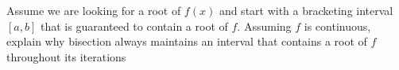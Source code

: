 \documentclass[12pt, leqno]{article}
\begin{document}

Assume we are looking for a root of $f(x)$ and start with a bracketing
interval $[a,b]$ that is guaranteed to contain a root of $f$. Assuming
$f$ is continuous, explain why bisection always maintains an interval
that contains a root of $f$ throughout its iterations
\end{document}
